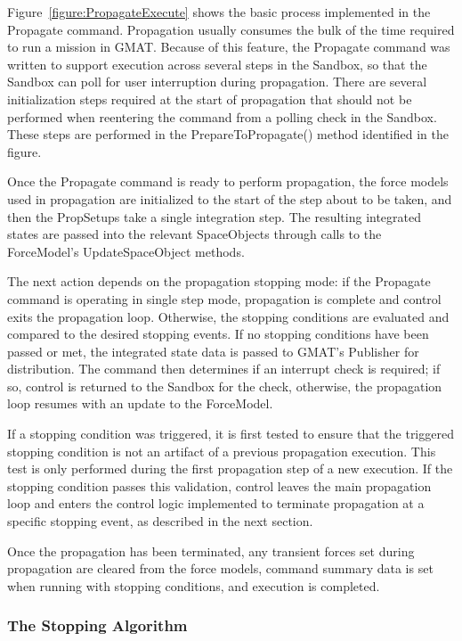 Figure~\ref{figure:PropagateExecute} shows the basic process implemented in the Propagate command.
Propagation usually consumes the bulk of the time required to run a mission in GMAT.  Because of
this feature, the Propagate command was written to support execution across several steps in the
Sandbox, so that the Sandbox can poll for user interruption during propagation.  There are several
initialization steps required at the start of propagation that should not be performed when
reentering the command from a polling check in the Sandbox.  These steps are performed in the
PrepareToPropagate() method identified in the figure.

Once the Propagate command is ready to perform propagation, the force models used in propagation are
initialized to the start of the step about to be taken, and then the PropSetups take a single
integration step.  The resulting integrated states are passed into the relevant SpaceObjects through
calls to the ForceModel's UpdateSpaceObject methods.

The next action depends on the propagation stopping mode: if the Propagate command is operating in
single step mode, propagation is complete and control exits the propagation loop.  Otherwise, the
stopping conditions are evaluated and compared to the desired stopping events.  If no stopping
conditions have been passed or met, the integrated state data is passed to GMAT's Publisher for
distribution.  The command then determines if an interrupt check is required; if so, control is
returned to the Sandbox for the check, otherwise, the propagation loop resumes with an update to the
ForceModel.

If a stopping condition was triggered, it is first tested to ensure that the triggered stopping
condition is not an artifact of a previous propagation execution.  This test is only performed
during the first propagation step of a new execution.  If the stopping condition passes this
validation, control leaves the main propagation loop and enters the control logic implemented to
terminate propagation at a specific stopping event, as described in the next section.

Once the propagation has been terminated, any transient forces set during propagation are cleared
from the force models, command summary data is set when running with stopping conditions, and
execution is completed.

\subsubsection{The Stopping Algorithm}


